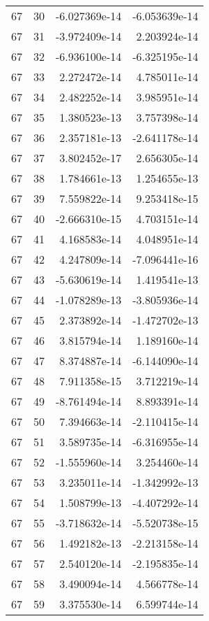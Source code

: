 \begin{tabular}{rrrr}
  67 &   30 & -6.027369e-14 & -6.053639e-14 \\
  67 &   31 & -3.972409e-14 &  2.203924e-14 \\
  67 &   32 & -6.936100e-14 & -6.325195e-14 \\
  67 &   33 &  2.272472e-14 &  4.785011e-14 \\
  67 &   34 &  2.482252e-14 &  3.985951e-14 \\
  67 &   35 &  1.380523e-13 &  3.757398e-14 \\
  67 &   36 &  2.357181e-13 & -2.641178e-14 \\
  67 &   37 &  3.802452e-17 &  2.656305e-14 \\
  67 &   38 &  1.784661e-13 &  1.254655e-13 \\
  67 &   39 &  7.559822e-14 &  9.253418e-15 \\
  67 &   40 & -2.666310e-15 &  4.703151e-14 \\
  67 &   41 &  4.168583e-14 &  4.048951e-14 \\
  67 &   42 &  4.247809e-14 & -7.096441e-16 \\
  67 &   43 & -5.630619e-14 &  1.419541e-13 \\
  67 &   44 & -1.078289e-13 & -3.805936e-14 \\
  67 &   45 &  2.373892e-14 & -1.472702e-13 \\
  67 &   46 &  3.815794e-14 &  1.189160e-14 \\
  67 &   47 &  8.374887e-14 & -6.144090e-14 \\
  67 &   48 &  7.911358e-15 &  3.712219e-14 \\
  67 &   49 & -8.761494e-14 &  8.893391e-14 \\
  67 &   50 &  7.394663e-14 & -2.110415e-14 \\
  67 &   51 &  3.589735e-14 & -6.316955e-14 \\
  67 &   52 & -1.555960e-14 &  3.254460e-14 \\
  67 &   53 &  3.235011e-14 & -1.342992e-13 \\
  67 &   54 &  1.508799e-13 & -4.407292e-14 \\
  67 &   55 & -3.718632e-14 & -5.520738e-15 \\
  67 &   56 &  1.492182e-13 & -2.213158e-14 \\
  67 &   57 &  2.540120e-14 & -2.195835e-14 \\
  67 &   58 &  3.490094e-14 &  4.566778e-14 \\
  67 &   59 &  3.375530e-14 &  6.599744e-14 \\

\end{tabular}
